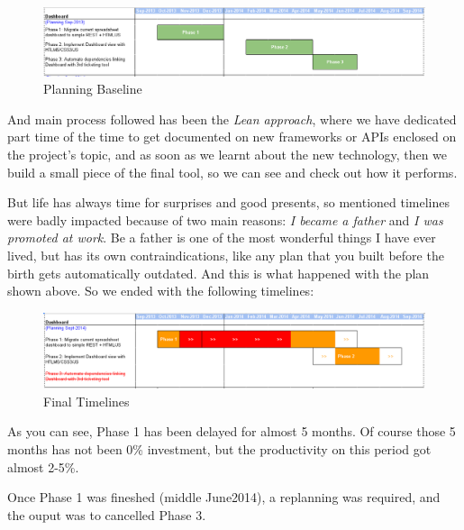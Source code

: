 \documentclass[a4paper,12pt,english]{book}
\begin{document}
\begin{figure}[ht!]
	\centering
   	\includegraphics[width=1\textwidth]{./resources/planning_baseline.png}
   	\caption{Planning Baseline}
   	\label{f_planning_baseline}
\end{figure}

And main process followed has been the \emph{Lean approach}, where we have
dedicated part time of the time to get documented on new frameworks or APIs
enclosed on the project's topic, and as soon as we learnt about the new
technology, then we build a small piece of the final tool, so we can see and
check out how it performs.

But life has always time for surprises and good presents, so mentioned timelines
were badly impacted because of two main reasons: \emph{I became a father} and
\emph{I was promoted at work}. Be a father is one of the most wonderful things
I have ever lived, but has its own contraindications, like any plan that you
built before the birth gets automatically outdated. And this is what happened
with the plan shown above. So we ended with the following timelines: 

\begin{figure}[ht!]
	\centering
   	\includegraphics[width=1\textwidth]{./resources/planning_sep2014.png}
   	\caption{Final Timelines}
   	\label{f_planning_final}
\end{figure}

As you can see, Phase 1 has been delayed for almost 5 months. Of course those 5
months has not been 0\% investment, but the productivity on this period got
almost 2-5\%.

Once Phase 1 was fineshed (middle June\/2014), a replanning was required, and
the ouput was to cancelled Phase 3.

%
%



\end{document}
